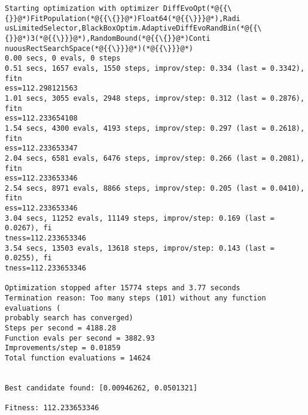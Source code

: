 \documentclass[12pt,a4paper]{article}
\begin{document}
\begin{lstlisting}
Starting optimization with optimizer DiffEvoOpt(*@{{\{}}@*)FitPopulation(*@{{\{}}@*)Float64(*@{{\}}}@*),Radi
usLimitedSelector,BlackBoxOptim.AdaptiveDiffEvoRandBin(*@{{\{}}@*)3(*@{{\}}}@*),RandomBound(*@{{\{}}@*)Conti
nuousRectSearchSpace(*@{{\}}}@*)(*@{{\}}}@*)
0.00 secs, 0 evals, 0 steps
0.51 secs, 1657 evals, 1550 steps, improv/step: 0.334 (last = 0.3342), fitn
ess=112.298121563
1.01 secs, 3055 evals, 2948 steps, improv/step: 0.312 (last = 0.2876), fitn
ess=112.233654108
1.54 secs, 4300 evals, 4193 steps, improv/step: 0.297 (last = 0.2618), fitn
ess=112.233653347
2.04 secs, 6581 evals, 6476 steps, improv/step: 0.266 (last = 0.2081), fitn
ess=112.233653346
2.54 secs, 8971 evals, 8866 steps, improv/step: 0.205 (last = 0.0410), fitn
ess=112.233653346
3.04 secs, 11252 evals, 11149 steps, improv/step: 0.169 (last = 0.0267), fi
tness=112.233653346
3.54 secs, 13503 evals, 13618 steps, improv/step: 0.143 (last = 0.0255), fi
tness=112.233653346

Optimization stopped after 15774 steps and 3.77 seconds
Termination reason: Too many steps (101) without any function evaluations (
probably search has converged)
Steps per second = 4188.28
Function evals per second = 3882.93
Improvements/step = 0.01859
Total function evaluations = 14624


Best candidate found: [0.00946262, 0.0501321]

Fitness: 112.233653346


\end{lstlisting}
\end{document}
